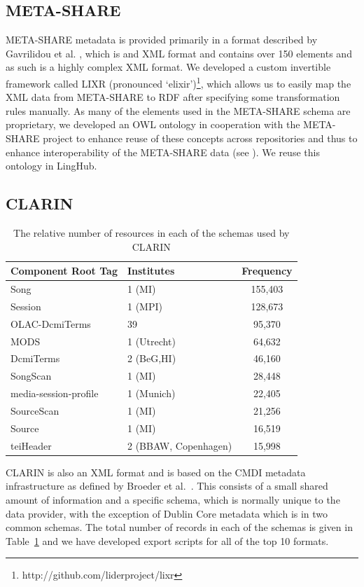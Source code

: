 \documentclass[smallextended]{svjour3}       %
\begin{document}
\subsection{META-SHARE}

META-SHARE metadata is provided primarily in a format described by
Gavrilidou et al. \cite{gavrilidou2012meta}, which is
and XML format and contains over 150 elements and as such is a highly complex XML
format. We developed a custom invertible framework called LIXR (pronounced
`elixir')\footnote{http://github.com/liderproject/lixr}, which allows us to
easily map the XML data from META-SHARE to RDF after specifying some
transformation rules manually.  As many of the elements used in the META-SHARE
schema are proprietary, we developed an OWL ontology in cooperation with the
META-SHARE project to enhance reuse of these concepts across repositories and
thus to enhance interoperability of the META-SHARE data (see
\cite{mccrae2015ontology}). We reuse this ontology in LingHub. 

\subsection{CLARIN}

\begin{table}
\begin{tabular}{llc}
    \toprule
Component Root Tag & Institutes & Frequency \\
\midrule
Song & 1 (MI) & 155,403 \\
Session & 1 (MPI) & 128,673 \\
OLAC-DcmiTerms & 39 & 95,370 \\
MODS & 1 (Utrecht)& 64,632 \\
DcmiTerms & 2 (BeG,HI) & 46,160 \\
SongScan & 1 (MI) & 28,448 \\
media-session-profile & 1 (Munich) & 22,405 \\
SourceScan & 1 (MI) & 21,256 \\
Source & 1 (MI) & 16,519 \\
teiHeader & 2 (BBAW, Copenhagen) & 15,998 \\
\bottomrule
\end{tabular}
    \caption{\label{tab:clarin-resources}The relative number of resources in
    each of the schemas used by CLARIN}
\end{table}

CLARIN is also an XML format and is based on the CMDI metadata infrastructure as
defined by Broeder et al.~\cite{broeder2012cmdi}. This consists of a small shared amount of information and
a specific schema, which is normally unique to the data provider, with the
exception of Dublin Core metadata which is in two common schemas. The total 
number of records in each of the schemas is given in Table~\ref{tab:clarin-resources} 
and we have developed export scripts for all of the
top 10 formats.
\end{document}
